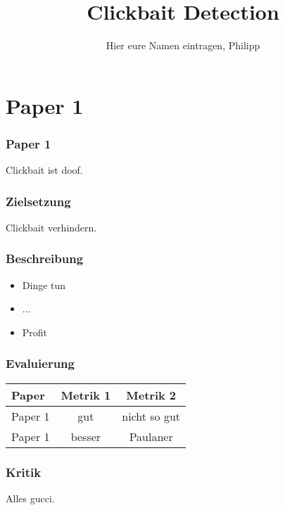 \documentclass{beamer}
\author{Hier eure Namen eintragen, Philipp}
\title{Clickbait Detection}
\begin{document}
\begin{frame}
\titlepage
\end{frame}

\section{Paper 1}
\begin{frame}
\frametitle{Paper 1}
    \begin{definition}
    Clickbait ist doof.
    \end{definition}
\end{frame}
\begin{frame}
    \frametitle{Zielsetzung}
    Clickbait verhindern.
\end{frame}
\begin{frame}
    \frametitle{Beschreibung}
    \begin{itemize}
    \item Dinge tun
    \item ... 
    \item Profit
    \end{itemize}
\end{frame}
\begin{frame}
    \frametitle{Evaluierung}
    \center
    \begin{tabular}{l c c}
    Paper & Metrik 1 & Metrik 2 \\ \hline 
    Paper 1 & gut & nicht so gut \\
    Paper 1 & besser & Paulaner \\
    \end{tabular}
\end{frame}
\begin{frame}
    \frametitle{Kritik}
    Alles gucci.
\end{frame}
\end{document}
